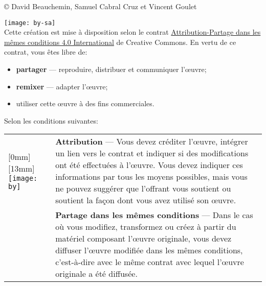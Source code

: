 \small
{\copyright} {\the\year} David Beauchemin, Samuel Cabral Cruz et Vincent Goulet \\

\vspace{\baselineskip}

\texttt{[image: by-sa]}\\%
Cette création est mise à disposition selon le contrat
\href{http://creativecommons.org/licenses/by-sa/4.0/deed.fr}{%
  Attribution-Partage dans les mêmes conditions 4.0 International} de
Creative Commons. En vertu de ce contrat, vous êtes libre de:
\begin{itemize}
\item \textbf{partager} --- reproduire, distribuer et communiquer
  l'{\oe}uvre;
\item \textbf{remixer} --- adapter l'{\oe}uvre;
\item utiliser cette {\oe}uvre à des fins commerciales.
\end{itemize}
Selon les conditions suivantes:

\begin{tabularx}{\linewidth}{@{}lX@{}}
  \raisebox{-9mm}[0mm][13mm]{%
    \texttt{[image: by]}} &
  \textbf{Attribution} --- Vous devez créditer l'{\oe}uvre, intégrer
  un lien vers le contrat et indiquer si des modifications ont été
  effectuées à l'{\oe}uvre. Vous devez indiquer ces informations par
  tous les moyens possibles, mais vous ne pouvez suggérer que
  l'offrant vous soutient ou soutient la façon dont vous avez utilisé
  son {\oe}uvre. \\
  \raisebox{-9mm}{\texttt{[image: sa]}}
  & \textbf{Partage dans les mêmes conditions} --- Dans le cas où vous
  modifiez, transformez ou créez à partir du matériel composant
  l'{\oe}uvre originale, vous devez diffuser l'{\oe}uvre modifiée dans
  les mêmes conditions, c'est-à-dire avec le même contrat avec lequel
  l'{\oe}uvre originale a été diffusée.
\end{tabularx}
